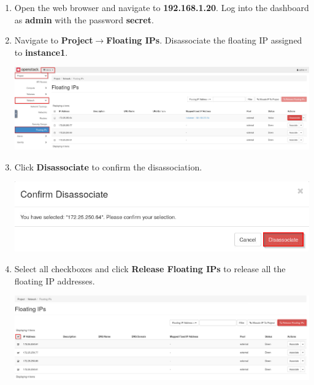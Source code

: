 \documentclass[letterpaper, 12pt]{article}
\begin{document}
\begin{enumerate}
    \item Open the web browser and navigate to \textbf{192.168.1.20}. Log into the dashboard as \textbf{admin} with the
    password \textbf{secret}.

    \item Navigate to \textbf{Project$\rightarrow$Floating IPs}. Disassociate the floating IP assigned to
    \textbf{instance1}.

    \begin{center}
        \includegraphics[width=\linewidth]{images/part4/step21.png}
    \end{center}

    \item Click \textbf{Disassociate} to confirm the disassociation.
    
    \begin{center}
        \includegraphics[width=\linewidth]{images/part4/step22.png}
    \end{center}

    \item Select all checkboxes and click \textbf{Release Floating IPs} to release all the floating IP addresses.
    
    \begin{center}
        \includegraphics[width=\linewidth]{images/part4/step23.png}
    \end{center}


\end{enumerate}
\end{document}
